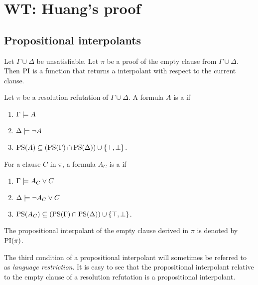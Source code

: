 
\chapter{WT: Huang's proof}

\section{Propositional interpolants}


Let $\Gamma \cup \Delta$ be unsatisfiable. Let $\pi$ be a proof of the empty clause from $\Gamma \cup \Delta$. Then $\operatorname{PI}$ is a function that returns a interpolant with respect to the current clause. 

\begin{defi}
	Let $\pi$ be a resolution refutation of $\Gamma \cup \Delta$.
	A formula $A$ is a  if
	\label{def:rel_prop_interpol}
	\begin{enumerate}
		\item $\Gamma \models A$
			\label{rel_prop_interpol_cond1}
		\item $\Delta \models \lnot A$
			\label{rel_prop_interpol_cond2}
		\item $\operatorname{PS}(A) \subseteq (\operatorname{PS}(\Gamma) \cap \operatorname{PS}(\Delta)) \cup \{\top, \bot\} $.
			\label{rel_prop_interpol_cond_lang}
	\end{enumerate}


	For a clause $C$ in $\pi$, a formula $A_C$ is a  if
	\label{def:rel_prop_interpol}
	\begin{enumerate}
		\item $\Gamma \models A_C \lor C$
			\label{rel_prop_interpol_cond1}
		\item $\Delta \models \lnot A_C \lor C$
			\label{rel_prop_interpol_cond2}
		\item $\operatorname{PS}(A_C) \subseteq (\operatorname{PS}(\Gamma) \cap \operatorname{PS}(\Delta)) \cup \{\top, \bot\} $.
			\label{rel_prop_interpol_cond_lang}
	\end{enumerate}

	The propositional interpolant of the empty clause derived in $\pi$ is denoted by $\operatorname{PI}(\pi)$.\qedhere
\end{defi}

The third condition of a propositional interpolant will sometimes be referred to as \emph{language restriction}.
It is easy to see that the propositional interpolant relative to the empty clause of a resolution refutation is a propositional interpolant.

